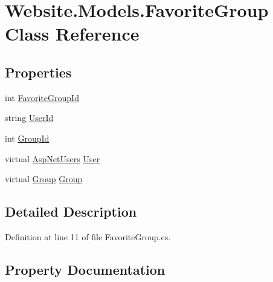 \hypertarget{class_website_1_1_models_1_1_favorite_group}{}\section{Website.\+Models.\+Favorite\+Group Class Reference}
\label{class_website_1_1_models_1_1_favorite_group}
\subsection*{Properties}
\begin{DoxyCompactItemize}
\item 
int \hyperlink{class_website_1_1_models_1_1_favorite_group_a55f48a56d7c524d4800d973c6044a86b}{Favorite\+Group\+Id}
\item 
string \hyperlink{class_website_1_1_models_1_1_favorite_group_a26a0058e6a90024ce53d2414ca80ba8e}{User\+Id}
\item 
int \hyperlink{class_website_1_1_models_1_1_favorite_group_a85b7575c1097a2a12db7d2f2aa43df24}{Group\+Id}
\item 
virtual \hyperlink{class_website_1_1_asp_net_users}{Asp\+Net\+Users} \hyperlink{class_website_1_1_models_1_1_favorite_group_a024158ace51660f77eec7d6a40b67c7a}{User}
\item 
virtual \hyperlink{class_website_1_1_models_1_1_group}{Group} \hyperlink{class_website_1_1_models_1_1_favorite_group_a50bc0bcb227249f628ae97ddd6d134ff}{Group}
\end{DoxyCompactItemize}


\subsection{Detailed Description}


Definition at line 11 of file Favorite\+Group.\+cs.



\subsection{Property Documentation}
\hypertarget{class_website_1_1_models_1_1_favorite_group_a55f48a56d7c524d4800d973c6044a86b}{}
